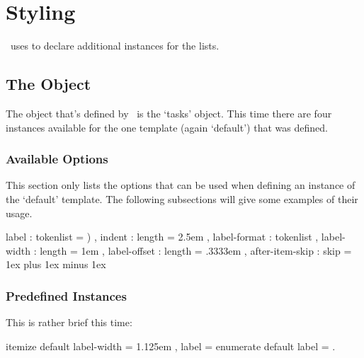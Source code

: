 \documentclass[load-preamble+]{cnltx-doc}
\begin{document}
\section{Styling \Tasks}
\Tasks\ uses  to declare additional instances for the lists.

\subsection{The  Object}\label{sec:tasks}
The object that's defined by \Tasks\ is the `tasks' object.  This time there
are four instances available for the one template (again `default') that was
defined.

\subsubsection{Available Options}
This section only lists the options that can be used when defining an instance
of the `default' template.  The following subsections will give some examples
of their usage.

\begin{sourcecode}
    {
      label           : tokenlist = \alph*) ,
      indent          : length    = 2.5em   ,
      label-format    : tokenlist           ,
      label-width     : length    = 1em     ,
      label-offset    : length    = .3333em ,
      after-item-skip : skip      = 1ex plus 1ex minus 1ex
    }
\end{sourcecode}

\subsubsection{Predefined Instances}
This is rather brief this time:
\begin{sourcecode}
   {itemize} {default}
    {
      label-width  = 1.125em ,
      label        = 
    }
   {enumerate} {default}
    { label = \arabic*. }
\end{sourcecode}
\end{document}
